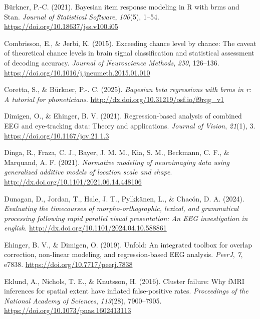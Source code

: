 \documentclass[
  doc,
  floatsintext,
  longtable,
  a4paper,
  nolmodern,
  notxfonts,
  notimes,
  colorlinks=true,linkcolor=blue,citecolor=blue,urlcolor=blue]{apa7}
\newlength{\cslhangindent}
\newenvironment{CSLReferences}[2] %
 {\begin{list}{}{%
  \setlength{\itemindent}{0pt}
  \setlength{\leftmargin}{0pt}
  \setlength{\parsep}{0pt}
  \ifodd #1
   \setlength{\leftmargin}{\cslhangindent}
   \setlength{\itemindent}{-1\cslhangindent}
  \fi
  \setlength{\itemsep}{#2\baselineskip}}}
 {\end{list}}
\begin{document}
\begin{CSLReferences}{1}{0}
Bürkner, P.-C. (2021). Bayesian item response modeling in {R} with
{brms} and {Stan}. \emph{Journal of Statistical Software},
\emph{100}(5), 1--54. \url{https://doi.org/10.18637/jss.v100.i05}

Combrisson, E., \& Jerbi, K. (2015). Exceeding chance level by chance:
{The} caveat of theoretical chance levels in brain signal classification
and statistical assessment of decoding accuracy. \emph{Journal of
Neuroscience Methods}, \emph{250}, 126--136.
\url{https://doi.org/10.1016/j.jneumeth.2015.01.010}

Coretta, S., \& Bürkner, P.-. C. (2025). \emph{Bayesian beta regressions
with brms in r: A tutorial for phoneticians}.
\url{http://dx.doi.org/10.31219/osf.io/f9rqg_v1}

Dimigen, O., \& Ehinger, B. V. (2021). Regression-based analysis of
combined EEG and eye-tracking data: Theory and applications.
\emph{Journal of Vision}, \emph{21}(1), 3.
\url{https://doi.org/10.1167/jov.21.1.3}

Dinga, R., Fraza, C. J., Bayer, J. M. M., Kia, S. M., Beckmann, C. F.,
\& Marquand, A. F. (2021). \emph{Normative modeling of neuroimaging data
using generalized additive models of location scale and shape}.
\url{http://dx.doi.org/10.1101/2021.06.14.448106}

Dunagan, D., Jordan, T., Hale, J. T., Pylkkänen, L., \& Chacón, D. A.
(2024). \emph{Evaluating the timecourses of morpho-orthographic,
lexical, and grammatical processing following rapid parallel visual
presentation: An EEG investigation in english}.
\url{http://dx.doi.org/10.1101/2024.04.10.588861}

Ehinger, B. V., \& Dimigen, O. (2019). Unfold: An integrated toolbox for
overlap correction, non-linear modeling, and regression-based {EEG}
analysis. \emph{PeerJ}, \emph{7}, e7838.
\url{https://doi.org/10.7717/peerj.7838}

Eklund, A., Nichols, T. E., \& Knutsson, H. (2016). Cluster failure: Why
fMRI inferences for spatial extent have inflated false-positive rates.
\emph{Proceedings of the National Academy of Sciences}, \emph{113}(28),
7900--7905. \url{https://doi.org/10.1073/pnas.1602413113}


\end{CSLReferences}
\end{document}
